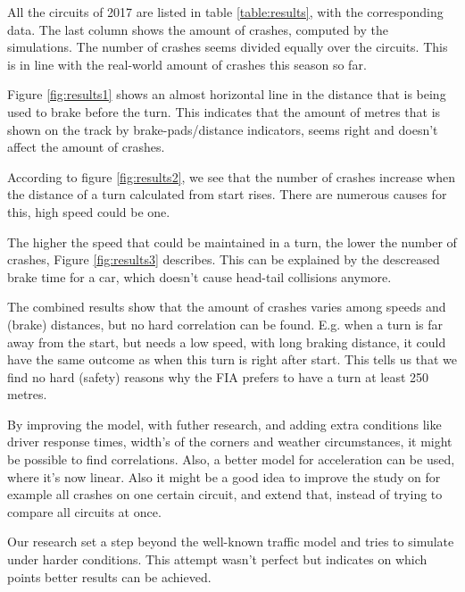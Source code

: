 All the circuits of 2017 are listed in table \ref{table:results}, with the corresponding data. The last column shows the amount of crashes, computed by the simulations. The number of crashes seems divided equally over the circuits. This is in line with the real-world amount of crashes this season so far.

Figure \ref{fig:results1} shows an almost horizontal line in the distance that is being used to brake before the turn. This indicates that the amount of metres that is shown on the track by brake-pads/distance indicators, seems right and doesn't affect the amount of crashes.

According to figure \ref{fig:results2}, we see that the number of crashes increase when the distance of a turn calculated from start rises. There are numerous causes for this, high speed could be one.

The higher the speed that could be maintained in a turn, the lower the number of crashes, Figure \ref{fig:results3} describes. This can be explained by the descreased brake time for a car, which doesn't cause head-tail collisions anymore.

The combined results show that the amount of crashes varies among speeds and (brake) distances, but no hard correlation can be found. E.g. when a turn is far away from the start, but needs a low speed, with long braking distance, it could have the same outcome as when this turn is right after start. This tells us that we find no hard (safety) reasons why the FIA prefers to have a turn at least 250 metres.

By improving the model, with futher research, and adding extra conditions like driver response times, width's of the corners and weather circumstances, it might be possible to find correlations. Also, a better model for acceleration can be used, where it's now linear. Also it might be a good idea to improve the study on for example all crashes on one certain circuit, and extend that, instead of trying to compare all circuits at once.

Our research set a step beyond the well-known traffic model and tries to simulate under harder conditions. This attempt wasn't perfect but indicates on which points better results can be achieved.
